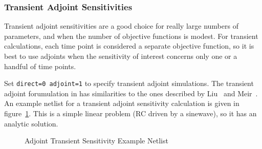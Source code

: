 \clearpage
\subsubsection{Transient Adjoint Sensitivities}
Transient adjoint sensitivities are a good choice for really large numbers of 
parameters, and when the number of objective functions is modest.  For transient
calculations, each time point is considered a separate objective function, so it 
is best to use adjoints when the sensitivity of interest concerns only one or 
a handful of time points.

Set \texttt{direct=0 adjoint=1} to specify transient adjoint simulations.   The 
transient adjoint forumulation in \Xyce{} has similarities to the ones described
by Liu~\cite{Liu2014} and Meir~\cite{BLAST2012}.  An example netlist for a transient 
adjoint sensitivity
calculation is given in figure~\ref{Tran_Adjoint_Sensitivity_Netlist}.  This is a simple 
linear problem (RC driven by a sinewave), so it has an analytic solution.  
\begin{figure}[htbp]
  \begin{centering}
\caption[Adjoint Transient Sensitivity Example Netlist]
{Adjoint Transient Sensitivity Example Netlist \label{Tran_Adjoint_Sensitivity_Netlist} }
\end{centering}
\end{figure}
